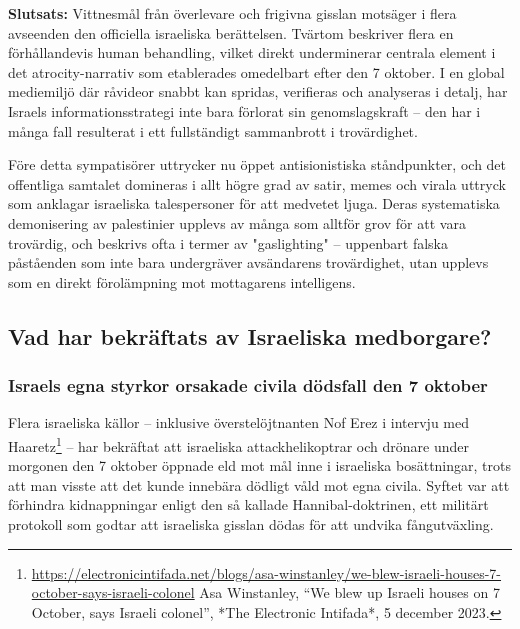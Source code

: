 \documentclass[12pt]{article}
\begin{document}
\textbf{Slutsats:} Vittnesmål från överlevare och frigivna gisslan motsäger i flera avseenden den officiella israeliska berättelsen. Tvärtom beskriver flera en förhållandevis human behandling, vilket direkt underminerar centrala element i det atrocity-narrativ som etablerades omedelbart efter den 7 oktober. I en global mediemiljö där råvideor snabbt kan spridas, verifieras och analyseras i detalj, har Israels informationsstrategi inte bara förlorat sin genomslagskraft – den har i många fall resulterat i ett fullständigt sammanbrott i trovärdighet.

Före detta sympatisörer uttrycker nu öppet antisionistiska ståndpunkter, och det offentliga samtalet domineras i allt högre grad av satir, memes och virala uttryck som anklagar israeliska talespersoner för att medvetet ljuga. Deras systematiska demonisering av palestinier upplevs av många som alltför grov för att vara trovärdig, och beskrivs ofta i termer av "gaslighting" – uppenbart falska påståenden som inte bara undergräver avsändarens trovärdighet, utan upplevs som en direkt förolämpning mot mottagarens intelligens.



\subsection*{Vad har bekräftats av Israeliska medborgare?}

\subsubsection*{Israels egna styrkor orsakade civila dödsfall den 7 oktober}
Flera israeliska källor – inklusive överstelöjtnanten Nof Erez i intervju med Haaretz\footnote{\url{https://electronicintifada.net/blogs/asa-winstanley/we-blew-israeli-houses-7-october-says-israeli-colonel} Asa Winstanley, “We blew up Israeli houses on 7 October, says Israeli colonel”, *The Electronic Intifada*, 5 december 2023.}
 – har bekräftat att israeliska attackhelikoptrar och drönare under morgonen den 7 oktober öppnade eld mot mål inne i israeliska bosättningar, trots att man visste att det kunde innebära dödligt våld mot egna civila. Syftet var att förhindra kidnappningar enligt den så kallade Hannibal-doktrinen, ett militärt protokoll som godtar att israeliska gisslan dödas för att undvika fångutväxling.
\end{document}
